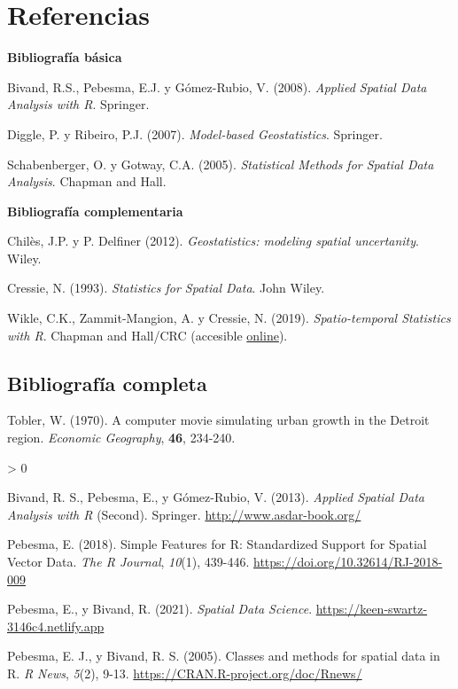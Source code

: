 \documentclass[
  spanish,
]{book}
\theoremstyle{break}
\newlength{\cslhangindent}
\newenvironment{CSLReferences}[2] %
 {%
  \setlength{\parindent}{0pt}
  \ifodd #1 \everypar{\setlength{\hangindent}{\cslhangindent}}\ignorespaces\fi
  \ifnum #2 > 0
  \setlength{\parskip}{#2\baselineskip}
  \fi
 }%
 {}
\theoremstyle{definition}
\theoremstyle{definition}
\theoremstyle{definition}
\theoremstyle{definition}
\theoremstyle{remark}
\begin{document}
\hypertarget{referencias}{%
\chapter*{Referencias}\label{referencias}}

\textbf{Bibliografía básica}

Bivand, R.S., Pebesma, E.J. y Gómez-Rubio, V. (2008). \emph{Applied Spatial Data Analysis with R}. Springer.

Diggle, P. y Ribeiro, P.J. (2007). \emph{Model-based Geostatistics}. Springer.

Schabenberger, O. y Gotway, C.A. (2005). \emph{Statistical Methods for Spatial Data Analysis}. Chapman and Hall.

\textbf{Bibliografía complementaria}

Chilès, J.P. y P. Delfiner (2012). \emph{Geostatistics: modeling spatial uncertanity}. Wiley.

Cressie, N. (1993). \emph{Statistics for Spatial Data}. John Wiley.

Wikle, C.K., Zammit-Mangion, A. y Cressie, N. (2019). \emph{Spatio-temporal Statistics with R}. Chapman and Hall/CRC (accesible \href{https://spacetimewithr.org}{online}).

\hypertarget{bibliografuxeda-completa}{%
\section*{Bibliografía completa}\label{bibliografuxeda-completa}}

Tobler, W. (1970). A computer movie simulating urban growth in the Detroit region. \emph{Economic Geography}, \textbf{46}, 234-240.

\hypertarget{refs}{}
\begin{CSLReferences}{1}{0}
\leavevmode\hypertarget{ref-Bivand2013}{}%
Bivand, R. S., Pebesma, E., y Gómez-Rubio, V. (2013). \emph{Applied Spatial Data Analysis with {R}} (Second). Springer. \url{http://www.asdar-book.org/}

\leavevmode\hypertarget{ref-Pebesma2018}{}%
Pebesma, E. (2018). {Simple Features for R: Standardized Support for Spatial Vector Data}. \emph{{The R Journal}}, \emph{10}(1), 439-446. \url{https://doi.org/10.32614/RJ-2018-009}

\leavevmode\hypertarget{ref-Pebesma2021}{}%
Pebesma, E., y Bivand, R. (2021). \emph{Spatial Data Science}. \url{https://keen-swartz-3146c4.netlify.app}

\leavevmode\hypertarget{ref-Pebesma2005}{}%
Pebesma, E. J., y Bivand, R. S. (2005). Classes and methods for spatial data in {R}. \emph{R News}, \emph{5}(2), 9-13. \url{https://CRAN.R-project.org/doc/Rnews/}

\end{CSLReferences}
\end{document}
